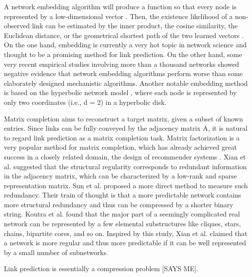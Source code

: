 A network embedding algorithm will produce a function so that every node is represented by a low-dimensional vector \cite{cui2018survey}. Then, the existence likelihood of a non-observed link can be estimated by the inner product, the cosine similarity, the Euclidean distance, or the geometrical shortest path of the two learned vectors \cite{cui2018survey, cannistraci2013minimum}.
On the one hand, embedding is currently a very hot topic in network science and thought to be a promising method for link prediction. On the other hand, some very recent empirical studies \cite{muscoloni2022adaptive, mara2020benchmarking, ghasemian2020stacking} involving more than a thousand networks showed negative evidence that network embedding algorithms perform worse than some elaborately designed mechanistic algorithms.
Another notable embedding method is based on the hyperbolic network model \cite{krioukov2010hyperbolic, papadopoulos2012popularity}, where each node is represented by only two coordinates (i.e., d = 2) in a hyperbolic disk.

Matrix completion aims to reconstruct a target matrix, given a subset of known entries. Since links can be fully conveyed by the adjacency matrix A, it is natural to regard link prediction as a matrix completion task. Matrix factorization is a very popular method for matrix completion, which has already achieved great success in a closely related domain, the design of recommender systems \cite{koren2009matrix}.
Xian et al. \cite{xian2020netsre} suggested that the structural regularity corresponds to redundant information in the adjacency matrix, which can be characterized by a low-rank and sparse representation matrix. Sun et al. \cite{sun2020revealing} proposed a more direct method to measure such redundancy. Their train of thought is that a more predictable network contains more structural redundancy and thus can be compressed by a shorter binary string.
Koutra et al. \cite{koutra2015summarizing} found that the major part of a seemingly complicated real network can be represented by a few elemental substructures like cliques, stars, chains, bipartite cores, and so on. Inspired by this study, Xian et al. \cite{xian2020netsre} claimed that a network is more regular and thus more predictable if it can be well represented by a small number of subnetworks. 

Link prediction is essentially a compression problem [SAYS ME].






